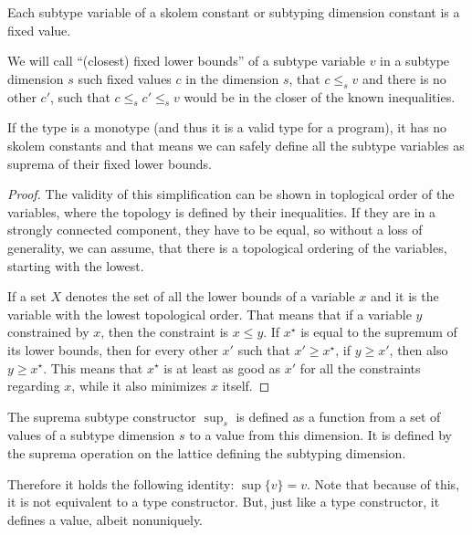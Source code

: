 \begin{defn}
    Each subtype variable of a skolem constant or subtyping dimension constant is a fixed value.
\end{defn}

\begin{defn}
    We will call ``(closest) fixed lower bounds'' of a subtype variable $v$ in a subtype dimension $s$ such fixed values $c$ in the dimension $s$, that $c \leq_s v$ and there is no other $c'$, such that $c \leq_s c' \leq_s v$ would be in the closer of the known inequalities.
\end{defn}

\begin{remark}
    If the type is a monotype (and thus it is a valid type for a program), it has no skolem constants and that means we can safely define all the subtype variables as suprema of their fixed lower bounds.
\end{remark}

\begin{lemma}
    \label{suprema-subtyping}
\end{lemma}

\begin{proof}
The validity of this simplification can be shown in toplogical order of the variables, where the topology is defined by their inequalities. If they are in a strongly connected component, they have to be equal, so without a loss of generality, we can assume, that there is a topological ordering of the variables, starting with the lowest.

If a set $X$ denotes the set of all the lower bounds of a variable $x$ and it is the variable with the lowest topological order. That means that if a variable $y$ constrained by $x$, then the constraint is $x \leq y$. If $x^\star$ is equal to the supremum of its lower bounds, then for every other $x'$ such that $x' \geq x^\star$, if $y \geq x'$, then also $y \geq x^\star$. This means that $x^\star$ is at least as good as $x'$ for all the constraints regarding $x$, while it also minimizes $x$ itself.
\end{proof}

\begin{defn}
    The suprema subtype constructor $\sup_s$ is defined as a function from a set of values of a subtype dimension $s$ to a value from this dimension. It is defined by the suprema operation on the lattice defining the subtyping dimension.

    Therefore it holds the following identity: $\sup \{v\} = v$. Note that because of this, it is not equivalent to a type constructor. But, just like a type constructor, it defines a value, albeit nonuniquely.
\end{defn}

